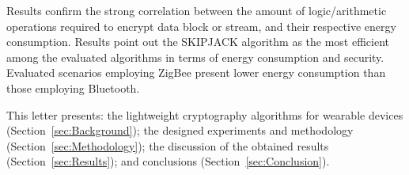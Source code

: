 Results confirm the strong correlation between the amount of logic/arithmetic operations required to encrypt data block or stream, and their respective energy consumption.
Results point out the SKIPJACK algorithm as the most efficient among the evaluated algorithms in terms of energy consumption and security. 
Evaluated scenarios employing ZigBee present lower energy consumption than those employing Bluetooth.

This letter presents: the lightweight cryptography algorithms for wearable devices (Section~\ref{sec:Background}); the designed experiments and methodology (Section~\ref{sec:Methodology}); the discussion of the obtained results (Section~\ref{sec:Results}); and conclusions (Section~\ref{sec:Conclusion}).

